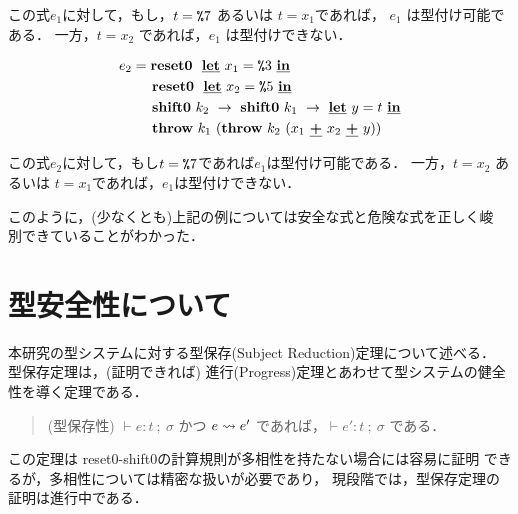 この式$e_1$に対して，もし，$t=\texttt{\%}{7}$ あるいは $t=x_1$であれば，
$e_1$ は型付け可能である．
一方，$t=x_2$ であれば，$e_1$ は型付けできない．

\begin{align*}
  e_2 & = \textbf{reset0} ~~\underline{\textbf{let}}~x_1=\texttt{\%}{3}~\underline{\textbf{in}} \\
      & \phantom{=}~~ \textbf{reset0} ~~\underline{\textbf{let}}~x_2=\texttt{\%}{5}~\underline{\textbf{in}} \\
      & \phantom{=}~~ \textbf{shift0}~k_2~\to~ \textbf{shift0}~k_1~\to~ \underline{\textbf{let}}~y=t~\underline{\textbf{in}} \\
      & \phantom{=}~~ \textbf{throw}~k_1~(\textbf{throw}~k_2~(x_1~\underline{\textbf{+}}~x_2~\underline{\textbf{+}}~y))
\end{align*}

この式$e_2$に対して，もし$t=\texttt{\%}{7}$であれば$e_1$は型付け可能である．
一方，$t=x_2$ あるいは $t=x_1$であれば，$e_1$は型付けできない．

このように，(少なくとも)上記の例については安全な式と危険な式を正しく峻
別できていることがわかった．

\section{型安全性について}

本研究の型システムに対する型保存(Subject Reduction)定理について述べる．
型保存定理は，(証明できれば)
進行(Progress)定理とあわせて型システムの健全性を導く定理である．

\begin{quote}
  (型保存性)
  $\vdash e:t~;~\sigma$ かつ $e \leadsto e'$ であれば，$\vdash e':t~;~\sigma$
  である．
\end{quote}

この定理は reset0-shift0の計算規則が多相性を持たない場合には容易に証明
できるが，多相性については精密な扱いが必要であり，
現段階では，型保存定理の証明は進行中である．

